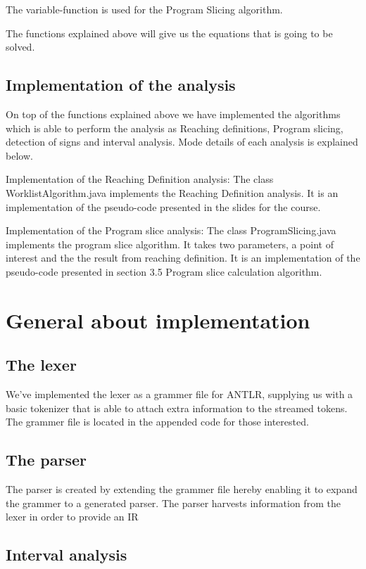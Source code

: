 The variable-function is used for the Program Slicing algorithm.
	
The functions explained above will give us the equations that is going to be solved.

\subsection{Implementation of the analysis}
On top of the functions explained above we have implemented the algorithms which is able to perform the analysis as Reaching definitions, Program slicing, detection of signs and interval analysis. 
Mode details of each analysis is explained below.

Implementation of the Reaching Definition analysis:
The class WorklistAlgorithm.java implements the Reaching Definition analysis.
It is an implementation of the pseudo-code presented in the slides for the course.

Implementation of the Program slice analysis:
The class ProgramSlicing.java implements the program slice algorithm.
It takes two parameters, a point of interest and the the result from reaching definition.
It is an implementation of the pseudo-code presented in section 3.5 Program slice calculation algorithm.


\section{General about implementation}

\subsection{The lexer}
We've implemented the lexer as a grammer file for ANTLR, supplying us with a basic tokenizer that is able to attach extra information to the streamed tokens. The grammer file is located in the appended code for those interested.
\subsection{The parser}
The parser is created by extending the grammer file hereby enabling it to expand the grammer to a generated parser. The parser harvests information from the lexer in order to provide an IR

\subsection{Interval analysis}

